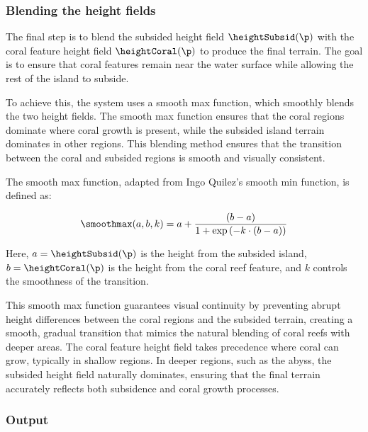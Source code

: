 
\subsubsection{Blending the height fields}

The final step is to blend the subsided height field $\heightSubsid(\p)$ with the coral feature height field $\heightCoral(\p)$ to produce the final terrain. The goal is to ensure that coral features remain near the water surface while allowing the rest of the island to subside.

To achieve this, the system uses a smooth max function, which smoothly blends the two height fields. The smooth max function ensures that the coral regions dominate where coral growth is present, while the subsided island terrain dominates in other regions. This blending method ensures that the transition between the coral and subsided regions is smooth and visually consistent.

The smooth max function, adapted from Ingo Quilez's smooth min function, is defined as:

\begin{align}
    \smoothmax(a, b, k) = a + \frac{(b - a)}{1 + \exp\left(-k \cdot (b - a)\right)}
\end{align}

Here, $a = \heightSubsid(\p)$ is the height from the subsided island, $b = \heightCoral(\p)$ is the height from the coral reef feature, and $k$ controls the smoothness of the transition.

This smooth max function guarantees visual continuity by preventing abrupt height differences between the coral regions and the subsided terrain, creating a smooth, gradual transition that mimics the natural blending of coral reefs with deeper areas. The coral feature height field takes precedence where coral can grow, typically in shallow regions. In deeper regions, such as the abyss, the subsided height field naturally dominates, ensuring that the final terrain accurately reflects both subsidence and coral growth processes.

\subsubsection{Output}

